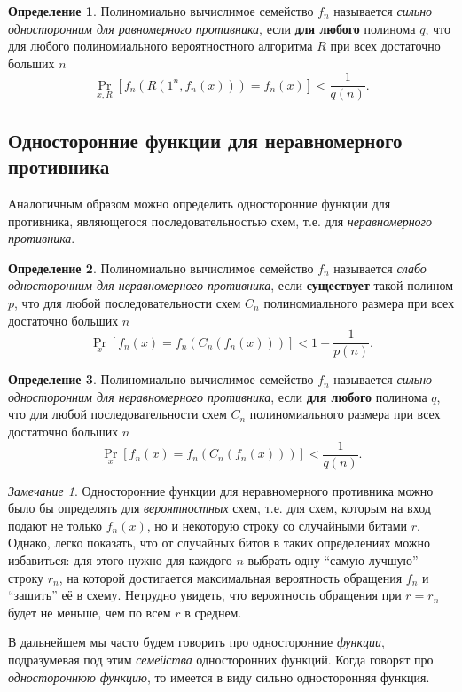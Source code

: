 \documentclass[12pt,a4paper]{article}
\theoremstyle{definition}
\newtheorem{definition}{Определение}[section]
\theoremstyle{plain}
\theoremstyle{remark}
\newtheorem{remark}{Замечание}[section]
\begin{document}
\begin{definition}
    Полиномиально вычислимое семейство $f_n$ называется 
    \emph{сильно односторонним для равномерного противника}, 
    если \textbf{для любого} полинома $q$, что
    для любого полиномиального вероятностного алгоритма $R$ 
    при всех достаточно больших $n$
    $$\Pr_{x,R}[f_n(R(1^n, f_n(x))) = f_n(x)] < \frac{1}{q(n)}.$$
\end{definition}

\subsection{Односторонние функции для неравномерного противника}
Аналогичным образом можно определить односторонние функции для противника, 
являющегося последовательностью схем, т.е. для \emph{неравномерного противника}.
\begin{definition}
    Полиномиально вычислимое семейство $f_n$ называется
    \emph{слабо односторонним для неравномерного противника}, 
    если \textbf{существует} такой полином $p$, 
    что для любой последовательности схем $C_n$ полиномиального размера
    при всех достаточно больших $n$
        $$\Pr_{x}[f_n(x) = f_n(C_n(f_n(x)))] < 1 - \frac{1}{p(n)}.$$
\end{definition}

\begin{definition}
    Полиномиально вычислимое семейство $f_n$ называется
    \emph{сильно односторонним для неравномерного противника}, 
    если \textbf{для любого} полинома $q$, 
    что для любой последовательности схем $C_n$ полиномиального размера
    при всех достаточно больших $n$
        $$\Pr_{x}[f_n(x) = f_n(C_n(f_n(x)))] < \frac{1}{q(n)}.$$
\end{definition}

\begin{remark}
Односторонние функции для неравномерного противника можно было бы 
определять для \emph{вероятностных} схем, т.е. для схем, которым на вход
подают не только $f_n(x)$, но и некоторую строку со случайными битами $r$.
Однако, легко показать, что от случайных битов в таких определениях
можно избавиться: для этого нужно для каждого $n$ выбрать одну ``самую лучшую''
строку $r_n$, на которой достигается максимальная вероятность обращения $f_n$
и ``зашить'' её в схему. Нетрудно увидеть, что вероятность обращения при 
$r = r_n$ будет не меньше, чем по всем $r$ в среднем.
\end{remark}

В дальнейшем мы часто будем говорить про односторонние \emph{функции}, 
подразумевая под этим \emph{семейства} односторонних функций. 
Когда говорят про \emph{одностороннюю функцию}, то имеется 
в виду сильно односторонняя функция.
\end{document}
